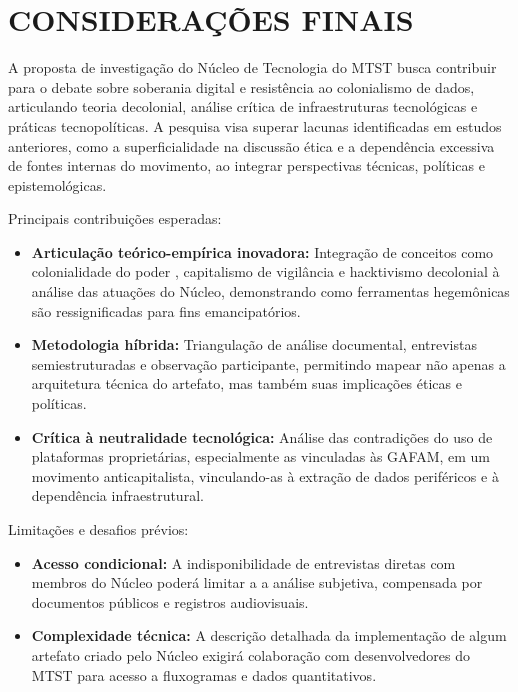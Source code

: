 
\chapter{CONSIDERAÇÕES FINAIS}
\label{chap:conclusao}

A proposta de investigação do Núcleo de Tecnologia do MTST busca contribuir para o debate sobre soberania digital e resistência ao colonialismo de dados, articulando teoria decolonial, análise crítica de infraestruturas tecnológicas e práticas tecnopolíticas. A pesquisa visa superar lacunas identificadas em estudos anteriores, como a superficialidade na discussão ética e a dependência excessiva de fontes internas do movimento, ao integrar perspectivas técnicas, políticas e epistemológicas.

Principais contribuições esperadas:

    \begin{itemize}
        \item \textbf{Articulação teórico-empírica inovadora:} Integração de conceitos como colonialidade do poder \cite{quijano2005}, capitalismo de vigilância \cite{Zuboff2019} e hacktivismo decolonial \cite{Faustino2023} à análise das atuações do Núcleo, demonstrando como ferramentas hegemônicas são ressignificadas para fins emancipatórios.
        \item \textbf{Metodologia híbrida:} Triangulação de análise documental, entrevistas semiestruturadas e observação participante, permitindo mapear não apenas a arquitetura técnica do artefato, mas também suas implicações éticas e políticas.
        \item \textbf{Crítica à neutralidade tecnológica:} Análise das contradições do uso de plataformas proprietárias, especialmente as vinculadas às GAFAM, em um movimento anticapitalista, vinculando-as à extração de dados periféricos e à dependência infraestrutural.
    \end{itemize}
    
Limitações e desafios prévios:

    \begin{itemize}
        \item \textbf{Acesso condicional:} A indisponibilidade de entrevistas diretas com membros do Núcleo poderá limitar a a análise subjetiva, compensada por documentos públicos e registros audiovisuais.
        \item \textbf{Complexidade técnica:} A descrição detalhada da implementação de algum artefato criado pelo Núcleo exigirá colaboração com desenvolvedores do MTST para acesso a fluxogramas e dados quantitativos.
    \end{itemize}

